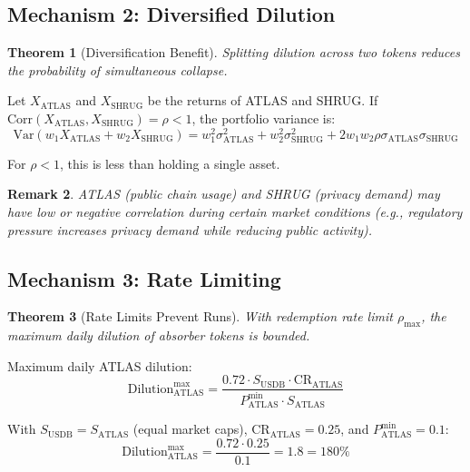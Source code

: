 \documentclass[11pt,a4paper]{article}
\newtheorem{theorem}{Theorem}[section]
\newtheorem{remark}[theorem]{Remark}
\begin{document}
\subsection{Mechanism 2: Diversified Dilution}

\begin{theorem}[Diversification Benefit]
Splitting dilution across two tokens reduces the probability of simultaneous collapse.
\end{theorem}

Let $X_{\text{ATLAS}}$ and $X_{\text{SHRUG}}$ be the returns of ATLAS and SHRUG. If $\text{Corr}(X_{\text{ATLAS}}, X_{\text{SHRUG}}) = \rho < 1$, the portfolio variance is:
\begin{equation}
\text{Var}(w_1 X_{\text{ATLAS}} + w_2 X_{\text{SHRUG}}) = w_1^2\sigma_{\text{ATLAS}}^2 + w_2^2\sigma_{\text{SHRUG}}^2 + 2w_1w_2\rho\sigma_{\text{ATLAS}}\sigma_{\text{SHRUG}}
\end{equation}

For $\rho < 1$, this is less than holding a single asset.

\begin{remark}
ATLAS (public chain usage) and SHRUG (privacy demand) may have low or negative correlation during certain market conditions (e.g., regulatory pressure increases privacy demand while reducing public activity).
\end{remark}

\subsection{Mechanism 3: Rate Limiting}

\begin{theorem}[Rate Limits Prevent Runs]
With redemption rate limit $\rho_{\max}$, the maximum daily dilution of absorber tokens is bounded.
\end{theorem}

Maximum daily ATLAS dilution:
\begin{equation}
\text{Dilution}_{\text{ATLAS}}^{\max} = \frac{0.72 \cdot S_{\text{USDB}} \cdot \text{CR}_{\text{ATLAS}}}{P_{\text{ATLAS}}^{\min} \cdot S_{\text{ATLAS}}}
\end{equation}

With $S_{\text{USDB}} = S_{\text{ATLAS}}$ (equal market caps), $\text{CR}_{\text{ATLAS}} = 0.25$, and $P_{\text{ATLAS}}^{\min} = 0.1$:
\begin{equation}
\text{Dilution}_{\text{ATLAS}}^{\max} = \frac{0.72 \cdot 0.25}{0.1} = 1.8 = 180\%
\end{equation}
\end{document}
